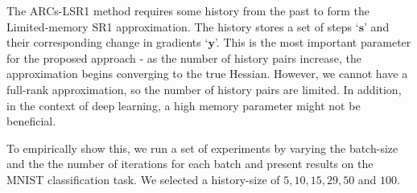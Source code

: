 The ARCs-LSR1 method requires some history from the past to form the Limited-memory SR1 approximation. The history stores a set of steps `$\mathbf{s}$' and their corresponding change in gradients `$\mathbf{y}$'. This is the most important parameter for the proposed approach - as the number of history pairs increase, the approximation begins converging to the true Hessian. However, we cannot have a full-rank approximation, so the number of history pairs are limited. In addition, in the context of deep learning, a high memory parameter might not be beneficial.

To empirically show this, we run a set of experiments by varying the batch-size and the the number of iterations for each batch and present results on the MNIST classification task. We selected a history-size of $5, 10, 15, 29, 50$ and $100$.

